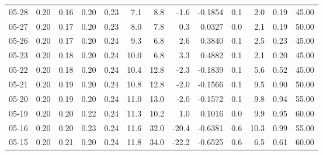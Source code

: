 \begin{threeparttable}
{\begin{tabular}{lrrrrrrrrrrrr}
  05-28 &          0.20 &          0.16 &          0.20 &        0.23 &                 7.1 &                 8.8 &       -1.6 &      -0.1854 &                 0.1 &              2.0 &            0.19 &                  45.00 \\
  05-27 &          0.20 &          0.17 &          0.20 &        0.23 &                 8.0 &                 7.8 &        0.3 &       0.0327 &                 0.0 &              2.1 &            0.19 &                  50.00 \\
  05-26 &          0.20 &          0.17 &          0.20 &        0.24 &                 9.3 &                 6.8 &        2.6 &       0.3840 &                 0.1 &              2.5 &            0.23 &                  45.00 \\
  05-23 &          0.20 &          0.18 &          0.20 &        0.24 &                10.0 &                 6.8 &        3.3 &       0.4882 &                 0.1 &              2.1 &            0.20 &                  45.00 \\
  05-22 &          0.20 &          0.18 &          0.20 &        0.24 &                10.4 &                12.8 &       -2.3 &      -0.1839 &                 0.1 &              5.6 &            0.52 &                  45.00 \\
  05-21 &          0.20 &          0.19 &          0.20 &        0.24 &                10.8 &                12.8 &       -2.0 &      -0.1566 &                 0.1 &              9.5 &            0.90 &                  50.00 \\
  05-20 &          0.20 &          0.19 &          0.20 &        0.24 &                11.0 &                13.0 &       -2.0 &      -0.1572 &                 0.1 &              9.8 &            0.94 &                  55.00 \\
  05-19 &          0.20 &          0.20 &          0.22 &        0.24 &                11.3 &                10.2 &        1.0 &       0.1016 &                 0.0 &              9.9 &            0.95 &                  60.00 \\
  05-16 &          0.20 &          0.20 &          0.23 &        0.24 &                11.6 &                32.0 &      -20.4 &      -0.6381 &                 0.6 &             10.3 &            0.99 &                  55.00 \\
  05-15 &          0.20 &          0.21 &          0.20 &        0.24 &                11.8 &                34.0 &      -22.2 &      -0.6525 &                 0.6 &              6.5 &            0.61 &                  60.00 \\

\end{tabular}}
\end{threeparttable}
